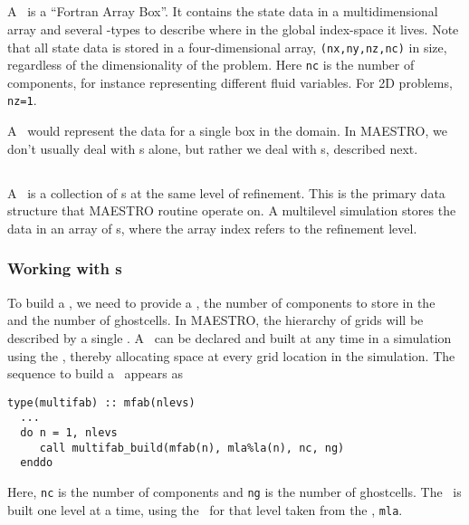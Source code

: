 \subsection{\fab}

A \fab\ is a ``Fortran Array Box''.  It contains the state data in a
multidimensional array and several \boxtype-types to describe where in
the global index-space it lives.  
Note that all state data is stored in a four-dimensional array,
{\tt (nx,ny,nz,nc)} in size, regardless of the dimensionality of the
problem.  Here {\tt nc} is the number of components, for instance
representing different fluid variables.  For 2D problems, {\tt nz=1}.

A \fab\ would represent the data for a single box in the domain.
In MAESTRO, we don't usually deal with \fab s alone, but rather
we deal with \multifab s, described next.

\subsection{\multifab}

A \multifab\ is a collection of \fab s at the same level of
refinement.  This is the primary data structure that MAESTRO
routine operate on.  A multilevel simulation stores the 
data in an array of \multifab s, where the array index refers
to the refinement level.

\subsubsection{Working with \multifab s}

To build a \multifab, we need to provide a \layout, the number of
components to store in the \multifab\, and the number of ghostcells.  In
MAESTRO, the hierarchy of grids will be described by a single
\mllayout.  A \multifab\ can be declared and built at any time in a
simulation using the \mllayout, thereby allocating space at every
grid location in the simulation.  The sequence to build a \multifab\
appears as
\begin{lstlisting}[language={[95]fortran},mathescape=false]
  type(multifab) :: mfab(nlevs)
  ...
  do n = 1, nlevs
     call multifab_build(mfab(n), mla%la(n), nc, ng)
  enddo
\end{lstlisting}
Here, {\tt nc} is the number of components and {\tt ng} is the number
of ghostcells.  The \multifab\ is built one level at a time, using the
\layout\ for that level taken from the \mllayout, {\tt mla}.

